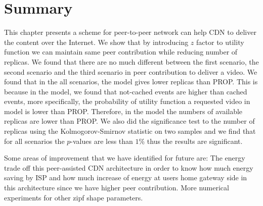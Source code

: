 \section{Summary}
This chapter presents a scheme for peer-to-peer network can help CDN to deliver the content over the Internet. 
We show that by introducing $z$ factor to utility function we can maintain same peer contribution while reducing number of replicas.
We found that there are no much different between the first scenario, the second scenario and the third scenario in peer contribution to deliver a video. 
We found that in the all scenarios, the model gives lower replicas than PROP. 
This is because in the model, we found that not-cached events are higher than cached events, more specifically, the probability of utility function a requested video in model is lower than PROP.
Therefore, in the model the numbers of available replicas are lower than PROP. 
We also did the significance test to the number of replicas using the Kolmogorov-Smirnov statistic on two samples and we find that for all scenarios the $p$-values are less than $1$\% thus the results are significant. 

Some areas of improvement that we have identified for future are:
The energy trade off this peer-assisted CDN architecture in order to know how much energy saving by ISP and how much increase of energy at users home gateway side in this architecture since we have higher peer contribution.   
More numerical experiments for other zipf shape parameters. 


